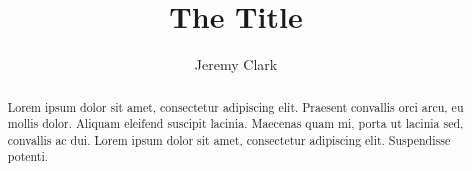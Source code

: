 \documentclass[letterpaper,UKenglish]{lipics-v2021}
\title{The Title}
\author{Jeremy Clark}{Concordia, Canada \and \url{https://www.pulpspy.com} }{pulpspy@gmail.com}{https://orcid.org/0000-0002-3533-5965}{Funding acknowledgements}
\begin{document}
\maketitle

\begin{abstract}
Lorem ipsum dolor sit amet, consectetur adipiscing elit. Praesent convallis orci arcu, eu mollis dolor. Aliquam eleifend suscipit lacinia. Maecenas quam mi, porta ut lacinia sed, convallis ac dui. Lorem ipsum dolor sit amet, consectetur adipiscing elit. Suspendisse potenti. 
\end{abstract}







\end{document}
